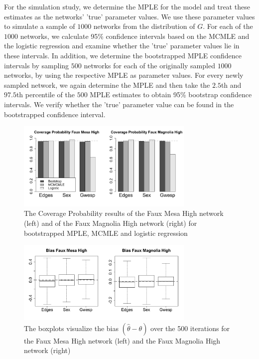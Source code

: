\documentclass[10pt, conference, compsocconf]{IEEEtran}
\begin{document}
\indent For the simulation study, we determine the MPLE for the model and treat these estimates as the networks' 'true' parameter values. We use these parameter values to simulate a sample of $1000$ networks from the distribution of $G$. For each of the $1000$ networks, we calculate 95\% confidence intervals based on the MCMLE and the logistic regression and examine whether the 'true' parameter values lie in these intervals. In addition, we determine the bootstrapped MPLE confidence intervals by sampling $500$ networks for each of the originally sampled $1000$ networks, by using the respective MPLE as parameter values. For every newly sampled network, we again determine the MPLE and then take the $2.5$th and $97.5$th percentile of the $500$ MPLE estimates to obtain  95\% bootstrap confidence intervals. We verify whether the 'true' parameter value can be found in the bootstrapped confidence interval. 

\begin{figure}
\includegraphics[width=8.5cm]{Coverage_Mesa_Magnolia_height05}
\caption{The Coverage Probability results of the Faux Mesa High network (left) and of the Faux Magnolia High network (right) for bootstrapped MPLE, MCMLE and logistic regression}
 \label{coverage}
\vspace{-.25cm}
\end{figure}

\begin{figure}
\includegraphics[width=8.5cm]{bias_plots_05}
\caption{The boxplots visualize the bias $(\hat{\theta}-\theta)$ over the 500 iterations for the Faux Mesa High network (left) and the Faux Magnolia High network (right)} 
\label{bias}
\vspace{-.25cm}
\end{figure}
\end{document}
